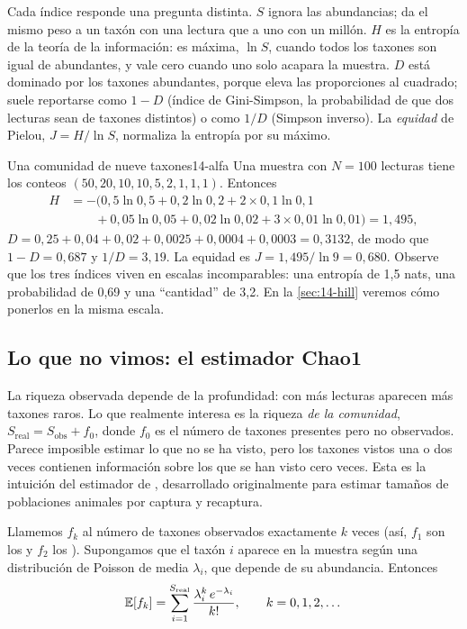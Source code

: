 Cada índice responde una pregunta distinta. $S$ ignora las abundancias; da el mismo peso a un taxón con una lectura que a uno con un millón. $H$ es la entropía de la teoría de la información: es máxima, $\ln S$, cuando todos los taxones son igual de abundantes, y vale cero cuando uno solo acapara la muestra. $D$ está dominado por los taxones abundantes, porque eleva las proporciones al cuadrado; suele reportarse como $1-D$ (índice de Gini-Simpson, la probabilidad de que dos lecturas sean de taxones distintos) o como $1/D$ (Simpson inverso). La \emph{equidad} de Pielou, $J = H/\ln S$, normaliza la entropía por su máximo.

\begin{ejemplo}{Una comunidad de nueve taxones}{14-alfa}
Una muestra con $N=100$ lecturas tiene los conteos $(50, 20, 10, 10, 5, 2, 1, 1, 1)$. Entonces
\[
\begin{aligned}
H &= -\bigl(0{,}5\ln 0{,}5 + 0{,}2\ln 0{,}2 + 2\times0{,}1\ln 0{,}1\\
  &\qquad + 0{,}05\ln 0{,}05 + 0{,}02\ln 0{,}02 + 3\times 0{,}01\ln 0{,}01\bigr) = 1{,}495,
\end{aligned}
\]
$D = 0{,}25 + 0{,}04 + 0{,}02 + 0{,}0025 + 0{,}0004 + 0{,}0003 = 0{,}3132$, de modo que $1-D = 0{,}687$ y $1/D = 3{,}19$. La equidad es $J = 1{,}495/\ln 9 = 0{,}680$. Observe que los tres índices viven en escalas incomparables: una entropía de 1,5 nats, una probabilidad de 0,69 y una ``cantidad'' de 3,2. En la \cref{sec:14-hill} veremos cómo ponerlos en la misma escala.
\end{ejemplo}

\subsection{Lo que no vimos: el estimador Chao1}

La riqueza observada depende de la profundidad: con más lecturas aparecen más taxones raros. Lo que realmente interesa es la riqueza \emph{de la comunidad}, $S_{\text{real}} = S_{\text{obs}} + f_0$, donde $f_0$ es el número de taxones presentes pero no observados. Parece imposible estimar lo que no se ha visto, pero los taxones vistos una o dos veces contienen información sobre los que se han visto cero veces. Esta es la intuición del estimador de \textcite{c14-chao1987}, desarrollado originalmente para estimar tamaños de poblaciones animales por captura y recaptura.

Llamemos $f_k$ al número de taxones observados exactamente $k$ veces (así, $f_1$ son los  y $f_2$ los ). Supongamos que el taxón $i$ aparece en la muestra según una distribución de Poisson de media $\lambda_i$, que depende de su abundancia. Entonces
\begin{equation}\label{eq:14-fk}
\mathbb{E}[f_k] = \sum_{i=1}^{S_{\text{real}}} \frac{\lambda_i^k\, e^{-\lambda_i}}{k!}, \qquad k = 0, 1, 2, \dots
\end{equation}

